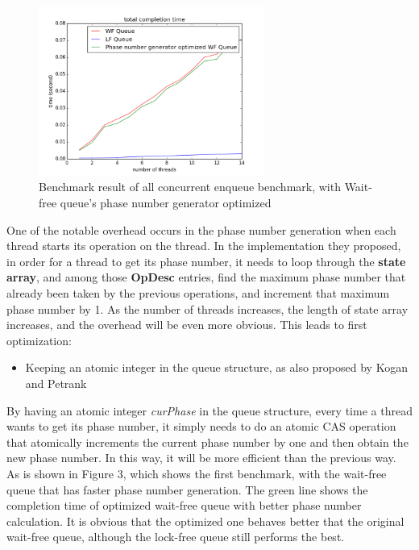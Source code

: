 \documentclass[a4paper]{article}
\begin{document}
\begin{figure}
\centering
\includegraphics[width=0.66\textwidth]{benchmark3.png}
\caption{\label{fig:benchmark3}Benchmark result of all concurrent enqueue benchmark, with Wait-free queue's phase number generator optimized}
\end{figure}

One of the notable overhead occurs in the phase number generation when each thread starts its operation on the thread. In the implementation they proposed, in order for a thread to get its phase number, it needs to loop through the \textbf{state array}, and among those \textbf{OpDesc} entries, find the maximum phase number that already been taken by the previous operations, and increment that maximum phase number by 1. As the number of threads increases, the length of state array increases, and the overhead will be even more obvious. This leads to first optimization:
\begin{itemize}
\item Keeping an atomic integer in the queue structure, as also proposed by Kogan and Petrank
\end{itemize}
By having an atomic integer \textit{curPhase} in the queue structure, every time a thread wants to get its phase number, it simply needs to do an atomic CAS operation that atomically increments the current phase number by one and then obtain the new phase number. In this way, it will be more efficient than the previous way. As is shown in Figure 3, which shows the first benchmark, with the wait-free queue that has faster phase number generation. The green line shows the completion time of optimized wait-free queue with better phase number calculation. It is obvious that the optimized one behaves better that the original wait-free queue, although the lock-free queue still performs the best. 
\end{document}
